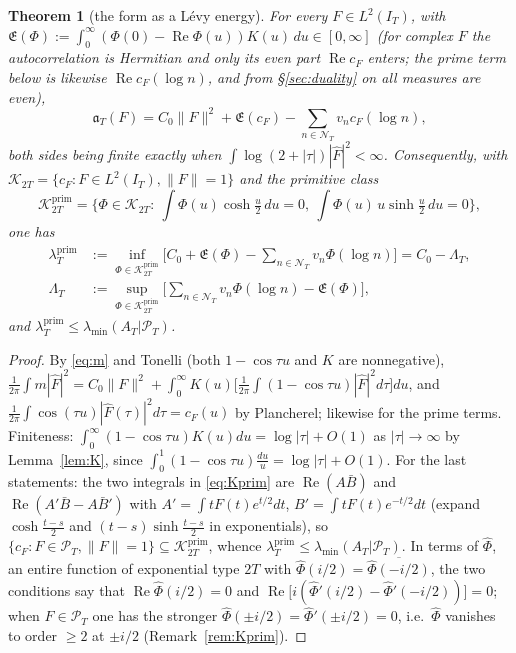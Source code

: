 \documentclass[11pt]{amsart}
\newtheorem{theorem}{Theorem}[section]
\theoremstyle{definition}
\theoremstyle{remark}
\newcommand{\Rel}{\operatorname{Re}}
\newcommand{\Kp}{\mathcal K^{\mathrm{prim}}_{2T}}
\newcommand{\Kw}{\mathcal K_{2T}}
\newcommand{\PT}{\mathcal P_T}
\newcommand{\IT}{I_T}
\newcommand{\lamP}{\lambda^{\mathrm{prim}}_T}
\newcommand{\lamA}{\lambda_{\min}(A_T|\PT)}
\newcommand{\Fh}{\widehat F}
\newcommand{\cF}{c_F}
\newcommand{\Lev}{\mathfrak E}
\newcommand{\NT}{\mathcal N_T}
\begin{document}
\begin{theorem}[the form as a L\'evy energy]\label{thm:A}
For every $F\in L^2(\IT)$, with $\Lev(\Phi):=\int_0^\infty(\Phi(0)-\Rel\Phi(u))K(u)\,du\in[0,\infty]$
(for complex $F$ the autocorrelation is Hermitian and only its even part $\Rel\cF$ enters; the
prime term below is likewise $\Rel\cF(\log n)$, and from \S\ref{sec:duality} on all measures are even),
\begin{equation}\label{eq:Aform}
\mathfrak a_T(F)=C_0\|F\|^2+\Lev(\cF)-\sum_{n\in\NT}v_n\cF(\log n),
\end{equation}
both sides being finite exactly when $\int\log(2+|\tau|)|\Fh|^2<\infty$. Consequently, with
$\Kw=\{\cF:F\in L^2(\IT),\|F\|=1\}$ and the primitive class
\begin{equation}\label{eq:Kprim}
\Kp=\Big\{\Phi\in\Kw:\ \int\Phi(u)\cosh\tfrac u2\,du=0,\ \int\Phi(u)\,u\sinh\tfrac u2\,du=0\Big\},
\end{equation}
one has
\begin{align*}
\lamP&:=\inf_{\Phi\in\Kp}\Big[C_0+\Lev(\Phi)-\sum_{n\in\NT}v_n\Phi(\log n)\Big]=C_0-\Lambda_T,\\
\Lambda_T&:=\sup_{\Phi\in\Kp}\Big[\sum_{n\in\NT}v_n\Phi(\log n)-\Lev(\Phi)\Big],
\end{align*}
and $\lamP\le\lamA$.
\end{theorem}
\begin{proof}
By \eqref{eq:m} and Tonelli (both $1-\cos\tau u$ and $K$ are nonnegative),
$\frac1{2\pi}\int m|\Fh|^2=C_0\|F\|^2+\int_0^\infty K(u)\Big[\frac1{2\pi}\int(1-\cos\tau u)|\Fh|^2d\tau\Big]du$,
and $\frac1{2\pi}\int\cos(\tau u)|\Fh(\tau)|^2d\tau=\cF(u)$ by Plancherel; likewise for the
prime terms. Finiteness: $\int_0^\infty(1-\cos\tau u)K(u)du=\log|\tau|+O(1)$ as $|\tau|\to\infty$
by Lemma~\ref{lem:K}, since $\int_0^1(1-\cos\tau u)\frac{du}u=\log|\tau|+O(1)$. For the last
statements: the two integrals in \eqref{eq:Kprim} are $\Rel(A\bar B)$ and $\Rel(A'\bar B-A\bar B')$
with $A'=\int tF(t)e^{t/2}dt$, $B'=\int tF(t)e^{-t/2}dt$ (expand $\cosh\frac{t-s}2$ and
$(t-s)\sinh\frac{t-s}2$ in exponentials), so $\{\cF:F\in\PT,\|F\|=1\}\subseteq\Kp$, whence
$\lamP\le\lamA$. In terms of $\widehat\Phi$, an entire function of exponential type $2T$ with
$\widehat\Phi(i/2)=\overline{\widehat\Phi(-i/2)}$, the two conditions say that
$\Rel\widehat\Phi(i/2)=0$ and $\Rel\big[i(\widehat\Phi'(i/2)-\widehat\Phi'(-i/2))\big]=0$; when
$F\in\PT$ one has the stronger $\widehat\Phi(\pm i/2)=\widehat\Phi'(\pm i/2)=0$, i.e.\ $\widehat\Phi$
vanishes to order $\ge2$ at $\pm i/2$ (Remark~\ref{rem:Kprim}).
\end{proof}
\end{document}

